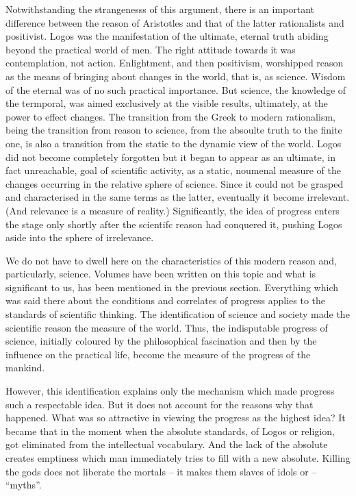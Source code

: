 Notwithstanding the strangenesss of this argument, there is an important 
difference between the reason of Aristotles and that of the latter 
rationalists and positivist. Logos was the manifestation of the ultimate,
eternal truth abiding beyond the practical world of men. The right attitude
towards it was contemplation, not action. Enlightment, and then positivism,
worshipped reason as the means of bringing about changes in the world, that
is, as science. Wisdom of the eternal was of no such practical importance.
But science, the knowledge of the termporal, was aimed exclusively at the 
visible results, ultimately, at the power to effect changes. The transition
from the Greek to modern rationalism, being the transition from reason to science,
from the absoulte truth to the finite one, is also a transition from the 
static to the dynamic view of the world. Logos did not become completely
forgotten but it began to appear as an ultimate, in fact unreachable, goal
of scientific activity, as a static, noumenal measure of the changes occurring
in the relative sphere of science.
Since it could not be grasped and characterised in the same terms as the 
latter, eventually it become irrelevant. (And relevance is a measure of
reality.) Significantly, the idea of progress enters the stage only shortly
after the scientifc reason had conquered it, pushing Logos aside into the 
sphere of irrelevance.

We do not have to dwell here on the characteristics of this modern reason and,
particularly, science. Volumes have been written on this topic and what is
significant to us, has been mentioned in the previous section. Everything
which was said there about the conditions and correlates of progress applies
to the standards of scientific thinking. The identification of science and
society made the scientific reason the measure of the world.
Thus, the indisputable progress of
science, initially coloured by the philosophical fascination and then by the 
influence on the practical life, become the measure of the progress of the 
mankind.

However, this identification explains only the mechanism which made
progress such a respectable idea. But it does not account for the reasons
why that happened. What was so attractive in viewing the progress as the 
 highest idea? 
It became that in the moment when the absolute standards,
 of Logos or religion, got eliminated from the intellectual vocabulary. 
And the lack of the absolute creates emptiness which man immediately tries to
fill with a new absolute. Killing the gods does not liberate the mortals --
it makes them slaves of idols or -- ``myths''.

